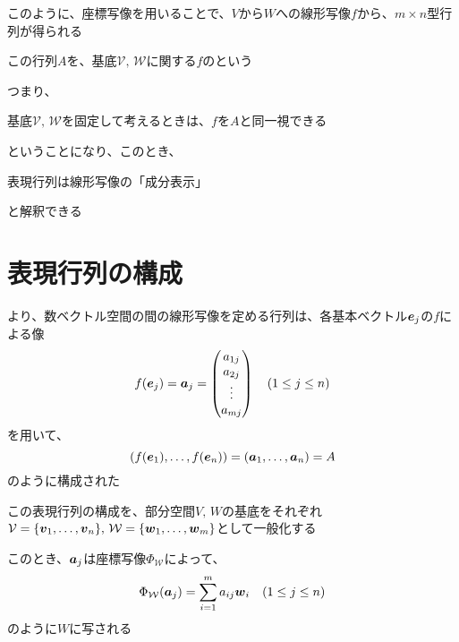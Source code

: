 \documentclass[../../../topic_linear-algebra]{subfiles}
\begin{document}
\sectionline

このように、座標写像を用いることで、$V$から$W$への線形写像$f$から、$m \times n$型行列が得られる

この行列$A$を、基底$\mathcal{V}, \, \mathcal{W}$に関する$f$のという

\br

つまり、
\begin{shaded}
  基底$\mathcal{V}, \, \mathcal{W}$を固定して考えるときは、$f$を$A$と同一視できる
\end{shaded}
ということになり、このとき、
\begin{shaded}
  表現行列は線形写像の「成分表示」
\end{shaded}
と解釈できる

\sectionline
\section{表現行列の構成}\label{sec:construction-of-matrix-rep}

より、数ベクトル空間の間の線形写像を定める行列は、各基本ベクトル$\vb*{e}_j$の$f$による像
\begin{equation*}
  f(\vb*{e}_j) = \vb*{a}_j = \begin{pmatrix}
    a_{1j} \\
    a_{2j} \\
    \vdots \\
    a_{mj}
  \end{pmatrix} \quad (1 \leq j \leq n)
\end{equation*}
を用いて、
\begin{equation*}
  \left( f(\vb*{e}_1), \ldots, f(\vb*{e}_n) \right) = \left( \vb*{a}_1, \ldots, \vb*{a}_n \right) = A
\end{equation*}
のように構成された

\br

この表現行列の構成を、部分空間$V,\,W$の基底をそれぞれ$\mathcal{V} = \{ \vb*{v}_1,\ldots, \vb*{v}_n\}, \, \mathcal{W} = \{\vb*{w}_1, \ldots, \vb*{w}_m\}$として一般化する

\br

このとき、$\vb*{a}_j$は座標写像$\Phi_{\mathcal{W}}$によって、
\begin{equation*}
  \Phi_{\mathcal{W}}(\vb*{a}_j) = \sum_{i=1}^m a_{ij} \vb*{w}_i \quad (1 \leq j \leq n)
\end{equation*}
のように$W$に写される
\end{document}
